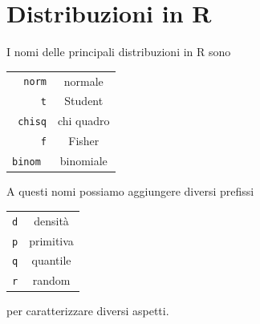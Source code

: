 \documentclass[onecolumn,12pt]{book}\usepackage[]{graphicx}\usepackage[]{color}
\begin{document}
\section{Distribuzioni in \textsf{R}}
I nomi delle principali distribuzioni in \textsf{R} sono\vskip10pt
\begin{tabular}{|r|c |}
\hline
\texttt{norm}&normale\\
\texttt{t}  &Student\\
\texttt{chisq}& chi quadro\\
\texttt{f}&Fisher\\
\texttt{binom }&binomiale\\
\hline
\end{tabular}\vskip10pt
A questi nomi possiamo aggiungere diversi prefissi\vskip10pt
\begin{tabular}{|r|c |}
\hline
\texttt{d}&densit\`a\\
\texttt{p}  &primitiva\\
\texttt{q}& quantile\\
\texttt{r}&random\\
  \hline
\end{tabular}
\vskip10pt
per caratterizzare diversi aspetti.
\end{document}
